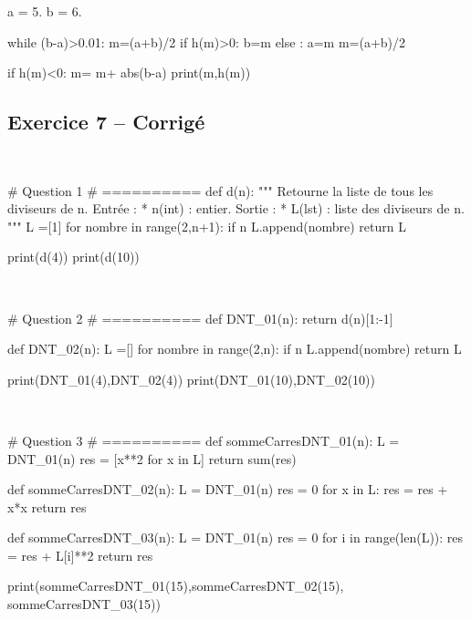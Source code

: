 \documentclass[10pt,fleqn]{article} %
\begin{document}
\begin{multicols}{2}
\begin{corrige}
\begin{python}
a = 5.
b = 6.

while (b-a)>0.01:
    m=(a+b)/2
    if h(m)>0:
        b=m
    else :
        a=m
m=(a+b)/2

if h(m)<0:
    m= m+ abs(b-a)
print(m,h(m))

\end{python}
\end{corrige}

\subsection*{Exercice 7 -- Corrigé}

\begin{corrige}
$\quad$
\begin{python}
# Question 1 
# ==========
def d(n):
    """
    Retourne la liste de tous les diviseurs de n.
    Entrée : 
     * n(int) : entier.
    Sortie : 
     * L(lst) : liste des diviseurs de n.
    """
    L =[1]
    for nombre in range(2,n+1):
        if n%
            L.append(nombre)
    return L

print(d(4))
print(d(10))
\end{python}
\end{corrige}

\begin{corrige}
$\quad$
\begin{python}
# Question 2 
# ==========
def DNT_01(n):
    return d(n)[1:-1]

def DNT_02(n):
    L =[]
    for nombre in range(2,n):
        if n%
            L.append(nombre)
    return L
    
print(DNT_01(4),DNT_02(4))
print(DNT_01(10),DNT_02(10))
\end{python}
\end{corrige}


\begin{corrige}
$\quad$
\begin{python}
# Question 3
# ==========
def sommeCarresDNT_01(n):
    L = DNT_01(n)
    res = [x**2 for x in L]
    return sum(res)

def sommeCarresDNT_02(n):
    L = DNT_01(n)
    res = 0
    for x in L:
        res = res + x*x
    return res
    
def sommeCarresDNT_03(n):
    L = DNT_01(n)
    res = 0
    for i in range(len(L)):
        res = res + L[i]**2
    return res
    
print(sommeCarresDNT_01(15),sommeCarresDNT_02(15),
    sommeCarresDNT_03(15))
\end{python}
\end{corrige}



\end{multicols}
\end{document}
